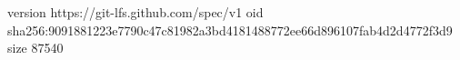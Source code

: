 version https://git-lfs.github.com/spec/v1
oid sha256:9091881223e7790c47c81982a3bd4181488772ee66d896107fab4d2d4772f3d9
size 87540
